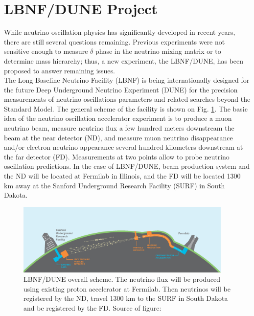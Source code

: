 
\section{LBNF/DUNE Project}

While neutrino oscillation physics has significantly developed in recent years, there are still several questions remaining. Previous experiments were not sensitive enough to measure $\delta$ phase in the neutrino mixing matrix or to determine mass hierarchy; thus, a new experiment, the LBNF/DUNE, has been proposed to answer remaining issues.\\

The Long Baseline Neutrino Facility (LBNF) is being internationally designed for the future Deep Underground Neutrino Experiment (DUNE) for the precision measurements of neutrino oscillations parameters and related searches beyond the Standard Model. The general scheme of the facility is shown on Fig. \ref{fig:LBNF_overallScheme}. The basic idea of the neutrino oscillation accelerator experiment is to produce a muon neutrino beam, measure neutrino flux a few hundred meters downstream the beam at the near detector (ND), and measure muon neutrino disappearance and/or electron neutrino appearance several hundred kilometers downstream at the far detector (FD). Measurements at two points allow to probe neutrino oscillation predictions. In the case of LBNF/DUNE, beam production system and the ND will be located at Fermilab in Illinois, and the FD will be located 1300 km away at the Sanford Underground Research Facility (SURF) in South Dakota. \\

\begin{figure}
\caption{LBNF/DUNE overall scheme. The neutrino flux will be produced using existing proton accelerator at Fermilab. Then neutrinos will be registered by the ND, travel 1300 km to the SURF in South Dakota and be registered by the FD. Source of figure: \cite{ref_LBNFweb} }
\label{fig:LBNF_overallScheme}
\centering
\includegraphics[width=0.95\textwidth, keepaspectratio=true]{figs/LBNF_overallScheme.png} 
\end{figure}

